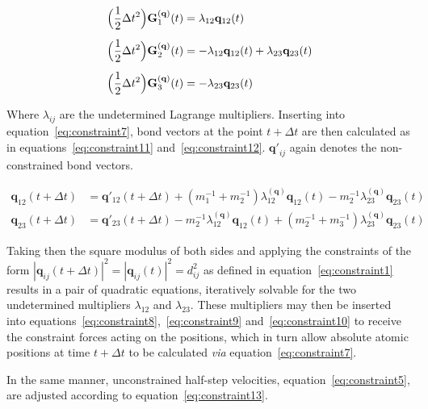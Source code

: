\documentclass[11pt]{article}
\begin{document}
\begin{align}
    &\Bigl(\frac{1}{2}\Delta t^2\Bigr)\mathbf{G}_1^{\mathbf{(q)}}(t) = \lambda_{12}\mathbf{q}_{12}(t)
    \label{eq:constraint8}\\[5pt]
    &\Bigl(\frac{1}{2}\Delta t^2\Bigr)\mathbf{G}_2^{\mathbf{(q)}}(t) = -\lambda_{12}\mathbf{q}_{12}(t) + \lambda_{23}\mathbf{q}_{23}(t)
    \label{eq:constraint9}\\[5pt]
    &\Bigl(\frac{1}{2}\Delta t^2\Bigr)\mathbf{G}_3^{\mathbf{(q)}}(t) = -\lambda_{23}\mathbf{q}_{23}(t)
    \label{eq:constraint10}
\end{align}


\bigskip

\noindent Where $\lambda_{ij}$ are the undetermined Lagrange multipliers. Inserting into equation~\ref{eq:constraint7}, bond vectors at the point $t + \Delta t$ are then calculated as in equations~\ref{eq:constraint11} and~\ref{eq:constraint12}. $\mathbf{q'}_{ij}$ again denotes the non-constrained bond vectors. 

\begin{align}
  \mathbf{q}_{12}(t + \Delta t) &= \mathbf{q}'_{12}(t + \Delta t) + (m_1^{-1} + m_2^{-1})\lambda^{(\mathbf{q})}_{12}\mathbf{q}_{12}(t)-m_2^{-1}\lambda^{(\mathbf{q})}_{23}\mathbf{q}_{23}(t) 
  \label{eq:constraint11}\\[5pt]
  \mathbf{q}_{23}(t + \Delta t) &= \mathbf{q}'_{23}(t + \Delta t) - m_2^{-1}\lambda^{(\mathbf{q})}_{12}\mathbf{q}_{12}(t)+(m_2^{-1} + m_3^{-1})\lambda^{(\mathbf{q})}_{23}\mathbf{q}_{23}(t)
  \label{eq:constraint12}
\end{align}

\bigskip


\noindent Taking then the square modulus of both sides and applying the constraints of the form $|\mathbf{q}_{ij}(t + \Delta t)|^2 =|\mathbf{q}_{ij}(t)|^2 = d_{ij}^2$ as defined in equation~\ref{eq:constraint1} results in a pair of quadratic equations, iteratively solvable for the two undetermined multipliers $\lambda_{12}$ and $\lambda_{23}$. These multipliers may then be inserted into equations~\ref{eq:constraint8},~\ref{eq:constraint9} and~\ref{eq:constraint10} to receive the constraint forces acting on the positions, which in turn allow absolute atomic positions at time $t + \Delta t$ to be calculated \textit{via} equation~\ref{eq:constraint7}.
\\ \par \noindent In the same manner, unconstrained half-step velocities, equation~\ref{eq:constraint5}, are adjusted according to equation~\ref{eq:constraint13}.
\end{document}
